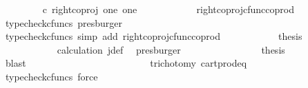 \begin{isabellebody}
\ \isamarkupfalse%
\ {\isachardoublequoteopen}{\isachardot}{\kern0pt}{\isachardot}{\kern0pt}{\isachardot}{\kern0pt}\ {\isacharequal}{\kern0pt}\ {\isacharparenleft}{\kern0pt}{\isasymlangle}{\isasymt}{\isacharcomma}{\kern0pt}\ {\isasymf}{\isasymrangle}\ {\isasymamalg}{\isasymlangle}{\isasymf}{\isacharcomma}{\kern0pt}\ {\isasymt}{\isasymrangle}{\isacharparenright}{\kern0pt}\ {\isasymcirc}\isactrlsub c\ right{\isacharunderscore}{\kern0pt}coproj\ one\ one{\isachardoublequoteclose}\isanewline
\ \ \ \ \ \ \ \ \ \ \isamarkupfalse%
\ right{\isacharunderscore}{\kern0pt}coproj{\isacharunderscore}{\kern0pt}cfunc{\isacharunderscore}{\kern0pt}coprod\ \isamarkupfalse%
\ {\isacharparenleft}{\kern0pt}typecheck{\isacharunderscore}{\kern0pt}cfuncs{\isacharcomma}{\kern0pt}\ presburger{\isacharparenright}{\kern0pt}\isanewline
\ \ \ \ \ \ \ \ \isamarkupfalse%
\ \isamarkupfalse%
\ {\isachardoublequoteopen}{\isachardot}{\kern0pt}{\isachardot}{\kern0pt}{\isachardot}{\kern0pt}\ {\isacharequal}{\kern0pt}\ {\isasymlangle}{\isasymf}{\isacharcomma}{\kern0pt}\ {\isasymt}{\isasymrangle}{\isachardoublequoteclose}\isanewline
\ \ \ \ \ \ \ \ \ \ \isamarkupfalse%
\ {\isacharparenleft}{\kern0pt}typecheck{\isacharunderscore}{\kern0pt}cfuncs{\isacharcomma}{\kern0pt}\ simp\ add{\isacharcolon}{\kern0pt}\ right{\isacharunderscore}{\kern0pt}coproj{\isacharunderscore}{\kern0pt}cfunc{\isacharunderscore}{\kern0pt}coprod{\isacharparenright}{\kern0pt}\isanewline
\ \ \ \ \ \ \ \ \isamarkupfalse%
\ \isamarkupfalse%
\ {\isacharquery}{\kern0pt}thesis\isanewline
\ \ \ \ \ \ \ \ \ \ \isamarkupfalse%
\ calculation\ j{\isacharunderscore}{\kern0pt}def\ \isamarkupfalse%
\ presburger\isanewline
\ \ \ \ \ \ \isamarkupfalse%
\isanewline
\ \ \ \ \ \ \isamarkupfalse%
\ \isamarkupfalse%
\ {\isacharquery}{\kern0pt}thesis\isanewline
\ \ \ \ \ \ \ \ \isamarkupfalse%
\ blast\isanewline
\ \ \ \ \isamarkupfalse%
\isanewline
\ \ \isamarkupfalse%
\isanewline
\ \ \ \ \isamarkupfalse%
\ \isamarkupfalse%
\ {\isachardoublequoteopen}{\isasymt}\ {\isacharequal}{\kern0pt}\ {\isasymf}{\isachardoublequoteclose}\isanewline
\ \ \ \ \ \ \isamarkupfalse%
\ trichotomy\ cart{\isacharunderscore}{\kern0pt}prod{\isacharunderscore}{\kern0pt}eq{}\ \isamarkupfalse%
\ {\isacharparenleft}{\kern0pt}typecheck{\isacharunderscore}{\kern0pt}cfuncs{\isacharcomma}{\kern0pt}\ force{\isacharparenright}{\kern0pt}\isanewline

\end{isabellebody}
